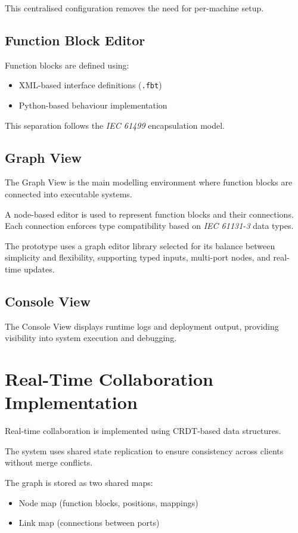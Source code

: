This centralised configuration removes the need for per-machine setup.

\subsection{Function Block Editor}

Function blocks are defined using:
\begin{itemize}
    \item XML-based interface definitions (\texttt{.fbt})
    \item Python-based behaviour implementation
\end{itemize}

This separation follows the \textit{IEC 61499} encapsulation model.

\subsection{Graph View}

The Graph View is the main modelling environment where function blocks are connected into executable systems.

A node-based editor is used to represent function blocks and their connections. Each connection enforces type compatibility based on \textit{IEC 61131-3} data types.

The prototype uses a graph editor library selected for its balance between simplicity and flexibility, supporting typed inputs, multi-port nodes, and real-time updates.

\subsection{Console View}

The Console View displays runtime logs and deployment output, providing visibility into system execution and debugging.

\section{Real-Time Collaboration Implementation}

Real-time collaboration is implemented using \ac{CRDT}-based data structures.

The system uses shared state replication to ensure consistency across clients without merge conflicts.

The graph is stored as two shared maps:
\begin{itemize}
    \item Node map (function blocks, positions, mappings)
    \item Link map (connections between ports)
\end{itemize}

